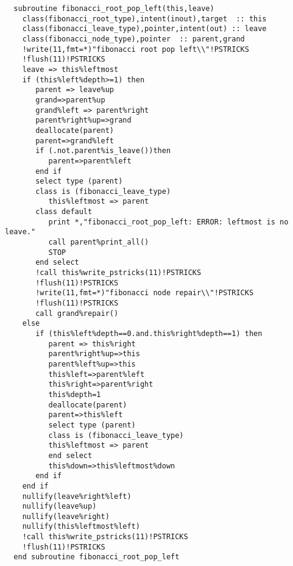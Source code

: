 \begin{Verbatim}
  subroutine fibonacci_root_pop_left(this,leave)
    class(fibonacci_root_type),intent(inout),target  :: this
    class(fibonacci_leave_type),pointer,intent(out) :: leave
    class(fibonacci_node_type),pointer  :: parent,grand
    !write(11,fmt=*)"fibonacci root pop left\\"!PSTRICKS
    !flush(11)!PSTRICKS
    leave => this%leftmost
    if (this%left%depth>=1) then
       parent => leave%up
       grand=>parent%up
       grand%left => parent%right
       parent%right%up=>grand
       deallocate(parent)
       parent=>grand%left
       if (.not.parent%is_leave())then
          parent=>parent%left
       end if
       select type (parent)
       class is (fibonacci_leave_type)
          this%leftmost => parent
       class default
          print *,"fibonacci_root_pop_left: ERROR: leftmost is no leave."
          call parent%print_all()
          STOP
       end select
       !call this%write_pstricks(11)!PSTRICKS
       !flush(11)!PSTRICKS
       !write(11,fmt=*)"fibonacci node repair\\"!PSTRICKS
       !flush(11)!PSTRICKS
       call grand%repair()
    else
       if (this%left%depth==0.and.this%right%depth==1) then
          parent => this%right
          parent%right%up=>this
          parent%left%up=>this
          this%left=>parent%left
          this%right=>parent%right
          this%depth=1
          deallocate(parent)
          parent=>this%left
          select type (parent)
          class is (fibonacci_leave_type)
          this%leftmost => parent
          end select
          this%down=>this%leftmost%down
       end if
    end if
    nullify(leave%right%left)
    nullify(leave%up)
    nullify(leave%right)
    nullify(this%leftmost%left)
    !call this%write_pstricks(11)!PSTRICKS
    !flush(11)!PSTRICKS
  end subroutine fibonacci_root_pop_left
\end{Verbatim}

